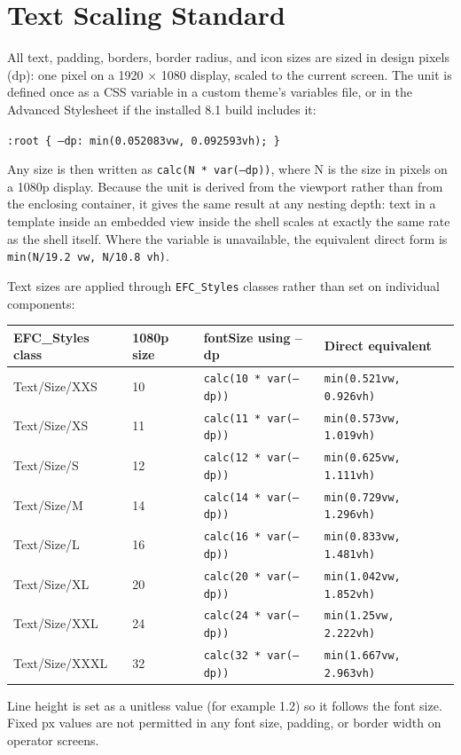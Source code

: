 \section{Text Scaling Standard}
All text, padding, borders, border radius, and icon sizes are sized in design pixels (dp): one pixel on a 1920 $\times$ 1080 display, scaled to the current screen. The unit is defined once as a CSS variable in a custom theme's variables file, or in the Advanced Stylesheet if the installed 8.1 build includes it:
\begin{center}\texttt{:root \{ --dp: min(0.052083vw, 0.092593vh); \}}\end{center}
Any size is then written as \texttt{calc(N * var(--dp))}, where N is the size in pixels on a 1080p display. Because the unit is derived from the viewport rather than from the enclosing container, it gives the same result at any nesting depth: text in a template inside an embedded view inside the shell scales at exactly the same rate as the shell itself. Where the variable is unavailable, the equivalent direct form is \texttt{min(N/\allowbreak{}19.\allowbreak{}2 vw, N/\allowbreak{}10.\allowbreak{}8 vh)}.

Text sizes are applied through \texttt{EFC\_Styles} classes rather than set on individual components:
\begin{center}
\begin{tabular}{@{}P{4.12cm}P{2.60cm}P{5.20cm}P{4.59cm}@{}}
\toprule
{}\textbf{EFC\_Styles class} & \textbf{1080p size} & \textbf{fontSize using --dp} & \textbf{Direct equivalent} \\
\midrule
Text/Size/XXS & 10 & \texttt{calc(10 * var(--dp))} & \texttt{min(0.\allowbreak{}521vw, 0.\allowbreak{}926vh)} \\
Text/Size/XS & 11 & \texttt{calc(11 * var(--dp))} & \texttt{min(0.\allowbreak{}573vw, 1.\allowbreak{}019vh)} \\
Text/Size/S & 12 & \texttt{calc(12 * var(--dp))} & \texttt{min(0.\allowbreak{}625vw, 1.\allowbreak{}111vh)} \\
Text/Size/M & 14 & \texttt{calc(14 * var(--dp))} & \texttt{min(0.\allowbreak{}729vw, 1.\allowbreak{}296vh)} \\
Text/Size/L & 16 & \texttt{calc(16 * var(--dp))} & \texttt{min(0.\allowbreak{}833vw, 1.\allowbreak{}481vh)} \\
Text/Size/XL & 20 & \texttt{calc(20 * var(--dp))} & \texttt{min(1.\allowbreak{}042vw, 1.\allowbreak{}852vh)} \\
Text/Size/XXL & 24 & \texttt{calc(24 * var(--dp))} & \texttt{min(1.\allowbreak{}25vw, 2.\allowbreak{}222vh)} \\
Text/Size/XXXL & 32 & \texttt{calc(32 * var(--dp))} & \texttt{min(1.\allowbreak{}667vw, 2.\allowbreak{}963vh)} \\
\bottomrule
\end{tabular}
\end{center}
Line height is set as a unitless value (for example 1.2) so it follows the font size. Fixed px values are not permitted in any font size, padding, or border width on operator screens.

